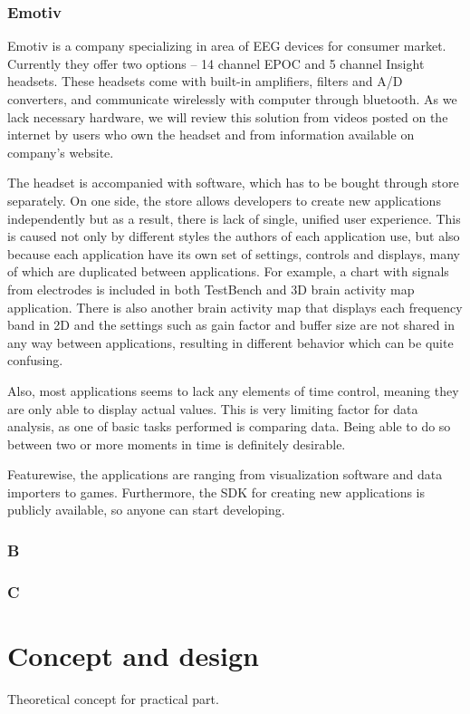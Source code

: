 \subsection{Emotiv}
Emotiv is a company specializing in area of EEG devices for consumer market.
Currently they offer two options -- 14 channel EPOC and 5 channel Insight
headsets. These headsets come with built-in amplifiers, filters and A/D
converters, and communicate wirelessly with computer through bluetooth. As
we lack necessary hardware, we will review this solution from videos posted on
the internet by users who own the headset and from information available on
company's website.

The headset is accompanied with software, which has to be bought through store
separately. On one side, the store allows developers to create new applications
independently but as a result, there is lack of single, unified user experience.
This is caused not only by different styles the authors of each application use,
but also because each application have its own set of settings, controls and
displays, many of which are duplicated between applications. For example, a
chart with signals from electrodes is included in both TestBench and 3D brain
activity map application. There is also another brain activity map that displays
each frequency band in 2D and the settings such as gain factor and buffer size
are not shared in any way between applications, resulting in different behavior
which can be quite confusing.

Also, most applications seems to lack any elements of time control, meaning
they are only able to display actual values. This is very limiting factor for
data analysis, as one of basic tasks performed is comparing data. Being
able to do so between two or more moments in time is definitely desirable.

Featurewise, the applications are ranging from visualization software and
data importers to games. Furthermore, the SDK for creating new applications is
publicly available, so anyone can start developing.
\subsection{B}
\subsection{C}
\chapter{Concept and design}
Theoretical concept for practical part.
